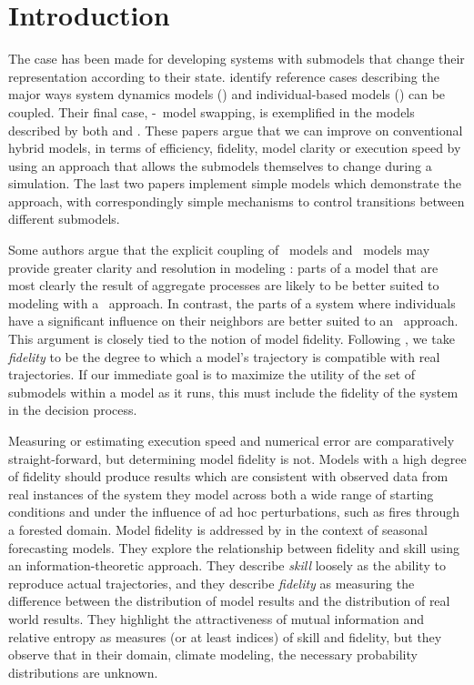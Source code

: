 \section{Introduction}
The case has been made for developing systems with sub\-models that
change their rep\-re\-sen\-ta\-tion according to their state.
\cite{vincenot2011theoretical} identify reference cases describing the
major ways system dynamics models (\SD) and in\-di\-vidu\-al-based models
(\IB) can be coupled. Their final case, \SD-\IB\ model swapping, is
exemplified in the models described by both \cite{bobashev2007hybrid}
and \cite{Gray2012adaptive}. These papers argue that we can improve on
conventional hybrid models, in terms of efficiency, fidelity, model
clarity or execution speed by using an approach that allows the
sub\-models themselves to change during a simulation. The last two
papers implement simple models which demonstrate the approach, with
correspondingly simple mechanisms to control transitions between
different sub\-models. 

Some authors argue that the explicit coupling of \SD\ models and
\IB\ models may provide greater clarity and resolution in modeling
\citep{vincenot2011theoretical,Fulton2010approaches}: parts of a model that are
most clearly the result of aggregate processes are likely to be better
suited to modeling with a \SD\ approach. In contrast, the
parts of a system where in\-di\-vidu\-als have a significant influence on
their neighbors \citep{botkin1972some} are better suited to an
\IB\ approach. This argument is closely tied to the notion of model
fidelity. Following \cite{delsole2010model}, we take
\emph{fidelity} to be the degree to which a model's trajectory is
compatible with real trajectories.  If our immediate goal is to
maximize the utility of the set of sub\-models within a model
as it runs, this must include the fidelity of the system in the
decision process.

Measuring or estimating execution speed and numerical error are
comparatively straight-forward, but determining model fidelity is not.
Models with a high degree of fidelity should produce results which are
consistent with observed data from real instances of the system they
model across both a wide range of starting conditions and under the
influence of ad hoc perturbations, such as fires through a forested
domain. Model fidelity is addressed by \cite{delsole2010model} in the
context of seasonal forecasting models. They explore the relationship
between fidelity and skill using an information-theoretic approach.
They describe \emph{skill} loosely as the ability to reproduce actual
trajectories, and they describe \emph{fidelity} as measuring the
difference between the distribution of model results and the
distribution of real world results.  They highlight the attractiveness
of mutual information and relative entropy as measures (or at least
indices) of skill and fidelity, but they observe that in their domain,
climate modeling, the necessary probability distributions are unknown.

